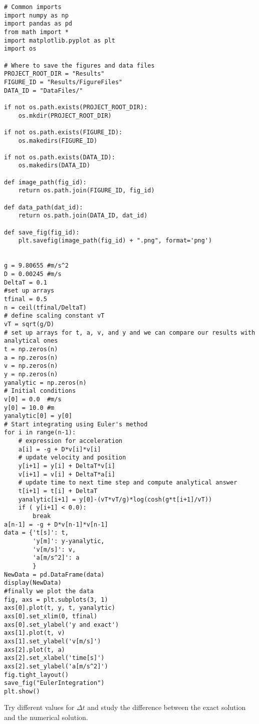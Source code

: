 \documentclass[%
oneside,                 %
final,                   %
10pt]{article}
\begin{document}
\begin{verbatim}
# Common imports
import numpy as np
import pandas as pd
from math import *
import matplotlib.pyplot as plt
import os

# Where to save the figures and data files
PROJECT_ROOT_DIR = "Results"
FIGURE_ID = "Results/FigureFiles"
DATA_ID = "DataFiles/"

if not os.path.exists(PROJECT_ROOT_DIR):
    os.mkdir(PROJECT_ROOT_DIR)

if not os.path.exists(FIGURE_ID):
    os.makedirs(FIGURE_ID)

if not os.path.exists(DATA_ID):
    os.makedirs(DATA_ID)

def image_path(fig_id):
    return os.path.join(FIGURE_ID, fig_id)

def data_path(dat_id):
    return os.path.join(DATA_ID, dat_id)

def save_fig(fig_id):
    plt.savefig(image_path(fig_id) + ".png", format='png')


g = 9.80655 #m/s^2
D = 0.00245 #m/s
DeltaT = 0.1
#set up arrays 
tfinal = 0.5
n = ceil(tfinal/DeltaT)
# define scaling constant vT
vT = sqrt(g/D)
# set up arrays for t, a, v, and y and we can compare our results with analytical ones
t = np.zeros(n)
a = np.zeros(n)
v = np.zeros(n)
y = np.zeros(n)
yanalytic = np.zeros(n)
# Initial conditions
v[0] = 0.0  #m/s
y[0] = 10.0 #m
yanalytic[0] = y[0]
# Start integrating using Euler's method
for i in range(n-1):
    # expression for acceleration
    a[i] = -g + D*v[i]*v[i]
    # update velocity and position
    y[i+1] = y[i] + DeltaT*v[i]
    v[i+1] = v[i] + DeltaT*a[i]
    # update time to next time step and compute analytical answer
    t[i+1] = t[i] + DeltaT
    yanalytic[i+1] = y[0]-(vT*vT/g)*log(cosh(g*t[i+1]/vT))
    if ( y[i+1] < 0.0):
        break
a[n-1] = -g + D*v[n-1]*v[n-1]
data = {'t[s]': t,
        'y[m]': y-yanalytic,
        'v[m/s]': v,
        'a[m/s^2]': a
        }
NewData = pd.DataFrame(data)
display(NewData)
#finally we plot the data
fig, axs = plt.subplots(3, 1)
axs[0].plot(t, y, t, yanalytic)
axs[0].set_xlim(0, tfinal)
axs[0].set_ylabel('y and exact')
axs[1].plot(t, v)
axs[1].set_ylabel('v[m/s]')
axs[2].plot(t, a)
axs[2].set_xlabel('time[s]')
axs[2].set_ylabel('a[m/s^2]')
fig.tight_layout()
save_fig("EulerIntegration")
plt.show()

\end{verbatim}


Try different values for $\Delta t$ and study the difference between the exact solution and the numerical solution.
\end{document}
